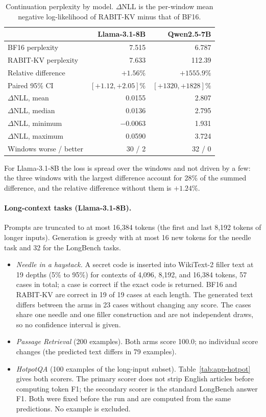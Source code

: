 \documentclass{article}
\begin{document}
\begin{table}[h]
\centering
\small
\setlength{\tabcolsep}{3.5pt}
\begin{tabular}{@{}lrr@{}}
\toprule
 & Llama-3.1-8B & Qwen2.5-7B \\
\midrule
BF16 perplexity & 7.515 & 6.787 \\
RABIT-KV perplexity & 7.633 & 112.39 \\
Relative difference & $+1.56\%$ & $+1555.9\%$ \\
Paired 95\% CI & $[+1.12, +2.05]\%$ & $[+1320, +1828]\%$ \\
$\Delta$NLL, mean & 0.0155 & 2.807 \\
$\Delta$NLL, median & 0.0136 & 2.795 \\
$\Delta$NLL, minimum & $-0.0063$ & 1.931 \\
$\Delta$NLL, maximum & 0.0590 & 3.724 \\
Windows worse / better & 30 / 2 & 32 / 0 \\
\bottomrule
\end{tabular}
\caption{Continuation perplexity by model. $\Delta$NLL is the per-window mean negative log-likelihood
of RABIT-KV minus that of BF16.}
\label{tab:app-ppl}
\end{table}

For Llama-3.1-8B the loss is spread over the windows and not driven by a few: the three windows with
the largest difference account for 28\% of the summed difference, and the relative difference without
them is $+1.24\%$.

\paragraph{Long-context tasks (Llama-3.1-8B).}
Prompts are truncated to at most 16,384 tokens (the first and last 8,192 tokens of longer inputs).
Generation is greedy with at most 16 new tokens for the needle task and 32 for the LongBench tasks.
\begin{itemize}
\item \emph{Needle in a haystack.} A secret code is inserted into WikiText-2 filler text at 19
  depths (5\% to 95\%) for contexts of 4,096, 8,192, and 16,384 tokens, 57 cases in total; a case is
  correct if the exact code is returned. BF16 and RABIT-KV are correct in 19 of 19 cases at each
  length. The generated text differs between the arms in 23 cases without changing any score. The
  cases share one needle and one filler construction and are not independent draws, so no confidence
  interval is given.
\item \emph{Passage Retrieval} (200 examples). Both arms score 100.0; no individual score changes
  (the predicted text differs in 79 examples).
\item \emph{HotpotQA} (100 examples of the long-input subset). Table~\ref{tab:app-hotpot} gives both
  scorers. The primary scorer does not strip English articles before computing token F1; the secondary
  scorer is the standard LongBench answer F1. Both were fixed before the run and are computed from the
  same predictions. No example is excluded.
\end{itemize}
\end{document}
